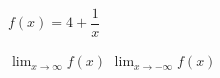 \noindent\begin{minipage}[t]{0.58\linewidth}\vspace{0pt}\raggedright $f(x)=4+\dfrac{1}{x}$\end{minipage}\hfill\begin{minipage}[t]{0.4\linewidth}\vspace{0pt}\centering \resizebox{\ifdim\width>\linewidth\linewidth\else\width\fi}{!}{}\end{minipage}\par
{} $\displaystyle\lim_{x\to\infty} f(x)$
 $\displaystyle\lim_{x\to-\infty} f(x)$
